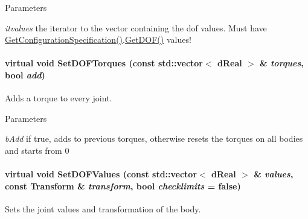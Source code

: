 \begin{DoxyParams}{Parameters}
\item[{\em itvalues}]the iterator to the vector containing the dof values. Must have \hyperlink{classOpenRAVE_1_1KinBody_a4e917473a7d475324af43320f83796fc}{GetConfigurationSpecification()}.\hyperlink{classOpenRAVE_1_1KinBody_a44fbec2fd26a45cada889c5c0f0751c8}{GetDOF()} values! \end{DoxyParams}
\hypertarget{classOpenRAVE_1_1KinBody_a4057204a0e2c01a59ea9011fb5bba922}{
\paragraph[{SetDOFTorques}]{\setlength{\rightskip}{0pt plus 5cm}virtual void SetDOFTorques (const std::vector$<$ dReal $>$ \& {\em torques}, \/  bool {\em add})}\hfill}
\label{classOpenRAVE_1_1KinBody_a4057204a0e2c01a59ea9011fb5bba922}


Adds a torque to every joint. 


\begin{DoxyParams}{Parameters}
\item[{\em bAdd}]if true, adds to previous torques, otherwise resets the torques on all bodies and starts from 0 \end{DoxyParams}
\hypertarget{classOpenRAVE_1_1KinBody_ad75a7828a47c91e1c572c111a6779fcd}{
\paragraph[{SetDOFValues}]{\setlength{\rightskip}{0pt plus 5cm}virtual void SetDOFValues (const std::vector$<$ dReal $>$ \& {\em values}, \/  const Transform \& {\em transform}, \/  bool {\em checklimits} = {\ttfamily false})}\hfill}
\label{classOpenRAVE_1_1KinBody_ad75a7828a47c91e1c572c111a6779fcd}


Sets the joint values and transformation of the body. 



